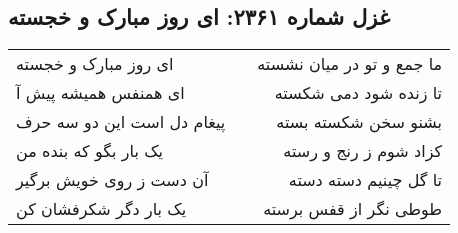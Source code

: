\begin{center}
\section*{غزل شماره ۲۳۶۱: ای روز مبارک و خجسته}
\label{sec:2361}
\begin{longtable}{l p{0.5cm} r}
ای روز مبارک و خجسته
&&
ما جمع و تو در میان نشسته
\\
ای همنفس همیشه پیش آ
&&
تا زنده شود دمی شکسته
\\
پیغام دل است این دو سه حرف
&&
بشنو سخن شکسته بسته
\\
یک بار بگو که بنده من
&&
کزاد شوم ز رنج و رسته
\\
آن دست ز روی خویش برگیر
&&
تا گل چینیم دسته دسته
\\
یک بار دگر شکرفشان کن
&&
طوطی نگر از قفس برسته
\\
\end{longtable}
\end{center}
